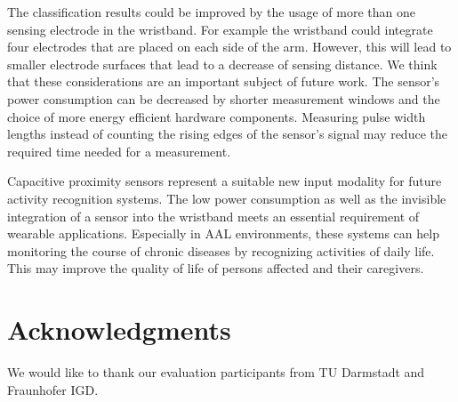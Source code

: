 \documentclass[runningheads,a4paper]{llncs}
\begin{document}
The classification results could be improved by the usage of more than one sensing electrode in the wristband. For example the wristband could integrate four electrodes that are placed on each side of the arm. However, this will lead to smaller electrode surfaces that lead to a decrease of sensing distance. We think that these considerations are an important subject of future work. The sensor's power consumption can be decreased by shorter measurement windows and the choice of more energy efficient hardware components. Measuring pulse width lengths instead of counting the rising edges of the sensor's signal may reduce the required time needed for a measurement.

Capacitive proximity sensors represent a suitable new input modality for future activity recognition systems. The low power consumption as well as the invisible integration of a sensor into the wristband meets an essential requirement of wearable applications. Especially in AAL environments, these systems can help monitoring the course of chronic diseases by recognizing activities of daily life. This may improve the quality of life of persons affected and their caregivers. 

\section*{Acknowledgments}
We would like to thank our evaluation participants from TU Darmstadt and Fraunhofer IGD.




\end{document}

